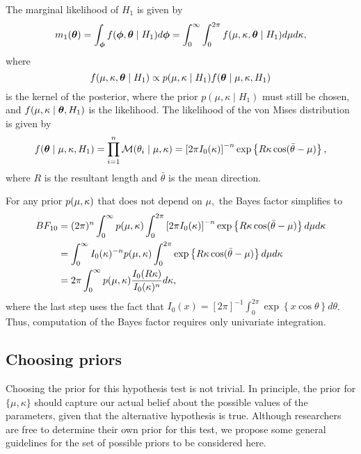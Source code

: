 The marginal likelihood of \( H_1 \) is given by
\begin{equation}
m_1(\boldsymbol{\theta}) = \int_{\boldsymbol{\phi}} f(\boldsymbol{\phi}, \boldsymbol{\theta} \mid H_1)  d\boldsymbol{\phi} = \int_0^{\infty}  \int_0^{2\pi} f(\mu, \kappa, \boldsymbol{\theta} \mid H_1)  d\mu d\kappa,
\end{equation}
where
\begin{equation}
f(\mu, \kappa, \boldsymbol{\theta} \mid  H_1) \propto p(\mu, \kappa \mid H_1) f(\boldsymbol{\theta} \mid \mu, \kappa,  H_1)
\end{equation}
is the kernel of the posterior, where the prior \( p(\mu, \kappa \mid H_1) \) must still be chosen, and \( f(\mu, \kappa \mid \boldsymbol{\theta},  H_1) \) is the likelihood. The likelihood of the von Mises distribution is given by
\begin{equation}
f(\boldsymbol{\theta} \mid \mu, \kappa,  H_1) = \prod_{i = 1}^n \mathcal{M} (\theta_i \mid \mu, \kappa) = \left[ 2 \pi I_0 (\kappa) \right]^{-n} \exp \left\{ R \kappa \cos (\bar{\theta} - \mu) \right\},
\end{equation}
where \( R \) is the resultant length and \( \bar{\theta} \) is the mean direction.

For any prior \( p(\mu, \kappa) \) that does not depend on \( \mu, \) the Bayes factor simplifies to
\begin{align}
BF_{10} %
&= (2 \pi)^n \int_0^{\infty} p(\mu, \kp) \int_0^{2\pi} \left[ 2 \pi I_0 (\kappa) \right]^{-n} \exp \left\{ R \kappa \cos (\bar{\theta} - \mu) \right\} d\mu d\kappa \\
&= \int_0^{\infty} I_0 (\kappa)^{-n} p(\mu, \kp) \int_0^{2\pi}  \exp \left\{ R \kappa \cos (\bar{\theta} - \mu) \right\} d\mu d\kappa \\
&= 2 \pi \int_0^{\infty}  p(\mu, \kp) \frac{I_0(R \kp)}{I_0 (\kappa)^n} d\kappa,
\end{align}
where the last step uses the fact that \( I_0(x) = [2 \pi]^{-1} \int_0^{2\pi} \exp\left\{ x \cos \theta \right\} d\theta\). Thus, computation of the Bayes factor requires only univariate integration.

\subsection{Choosing priors}
\label{sub:Priors}

Choosing the prior for this hypothesis test is not trivial. In principle, the prior for \( \{ \mu, \kappa \} \) should capture our actual belief about the possible values of the parameters, given that the alternative hypothesis is true. Although researchers are free to determine their own prior for this test, we propose some general guidelines for the set of possible priors to be considered here. 

